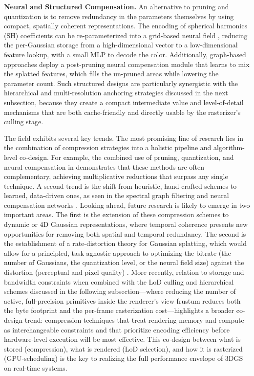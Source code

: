 \documentclass[11pt,a4paper]{article}
\begin{document}
\textbf{Neural and Structured Compensation.} An alternative to pruning and quantization is to remove redundancy in the parameters themselves by using compact, spatially coherent representations. The encoding of spherical harmonics (SH) coefficients can be re-parameterized into a grid-based neural field \cite{arxiv:2311.13681v2}, reducing the per-Gaussian storage from a high-dimensional vector to a low-dimensional feature lookup, with a small MLP to decode the color. Additionally, graph-based approaches \cite{arxiv:2405.00676v1} deploy a post-pruning neural compensation module that learns to mix the splatted features, which fills the un-pruned areas while lowering the parameter count. Such structured designs are particularly synergistic with the hierarchical and multi-resolution anchoring strategies discussed in the next subsection, because they create a compact intermediate value and level-of-detail mechanisms that are both cache-friendly and directly usable by the rasterizer's culling stage.

The field exhibits several key trends. The most promising line of research lies in the combination of compression strategies into a holistic pipeline and algorithm-level co-design. For example, the combined use of pruning, quantization, and neural compensation in \cite{arxiv:2311.13681v2,arxiv:2406.17074v1} demonstrates that these methods are often complementary, achieving multiplicative reductions that surpass any single technique. A second trend is the shift from heuristic, hand-crafted schemes to learned, data-driven ones, as seen in the spectral graph filtering \cite{arxiv:2405.00676v1} and neural compensation networks \cite{arxiv:2405.00676v1}. Looking ahead, future research is likely to emerge in two important areas. The first is the extension of these compression schemes to dynamic or 4D Gaussian representations, where temporal coherence presents new opportunities for removing both spatial and temporal redundancy. The second is the establishment of a rate-distortion theory for Gaussian splatting, which would allow for a principled, task-agnostic approach to optimizing the bitrate (the number of Gaussians, the quantization level, or the neural field size) against the distortion (perceptual and pixel quality) \cite{arxiv:2311.13681v2}. More recently, relation to storage and bandwidth constraints when combined with the LoD culling and hierarchical schemes discussed in the following subsection---where reducing the number of active, full-precision primitives inside the renderer's view frustum reduces both the byte footprint and the per-frame rasterization cost---highlights a broader co-design trend: compression techniques that treat rendering memory and compute as interchangeable constraints \cite{arxiv:2310.08528v2} and that prioritize encoding efficiency before hardware-level execution will be most effective. This co-design between what is stored (compression), what is rendered (LoD selection), and how it is rasterized (GPU-scheduling) is the key to realizing the full performance envelope of 3DGS on real-time systems.
\end{document}
